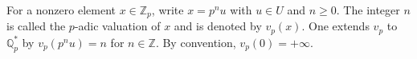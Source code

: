 For a nonzero element $x \in \mathbb{Z}_p$, write $x = p^n u$ with $u \in U$ and $n \geq 0$. The integer $n$ is called the $p$-adic valuation of $x$ and is denoted by $v_p(x)$. One extends $v_p$ to $\mathbb{Q}_p^*$ by $v_p(p^n u) = n$ for $n \in \mathbb{Z}$. By convention, $v_p(0) = +\infty$.
